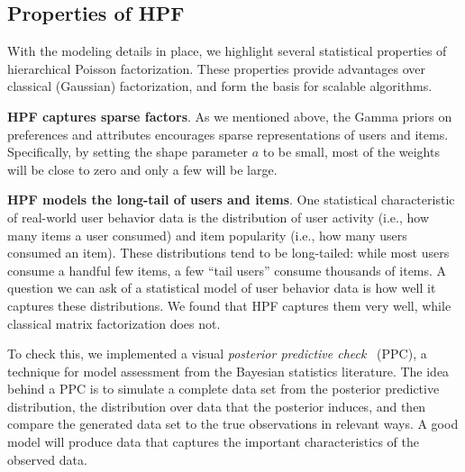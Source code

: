 
\subsection{Properties of HPF}

With the modeling details in place, we highlight several statistical
properties of hierarchical Poisson factorization.  These properties
provide advantages over classical (Gaussian) factorization, and
form the basis for scalable algorithms.

{\bf HPF captures sparse factors}.  As we mentioned above, the
  Gamma priors on preferences and attributes encourages sparse
  representations of users and items.  Specifically, by setting the
  shape parameter $a$ to be small, most of the weights will be close
  to zero and only a few will be large.


{\bf HPF models the long-tail of users and items}.  One statistical
characteristic of real-world user behavior data is the distribution of
user activity (i.e., how many items a user consumed) and item
popularity (i.e., how many users consumed an item).  These
distributions tend to be long-tailed: while most users consume a
handful few items, a few ``tail users'' consume thousands of items.  A
question we can ask of a statistical model of user behavior data is
how well it captures these distributions.  We found that HPF captures
them very well, while classical matrix factorization does not.

To check this, we implemented a visual \textit{posterior predictive
  check}~\cite{Rubin:1984,Gelman:1996} (PPC), a technique for model
assessment from the Bayesian statistics literature.  The idea behind a
PPC is to simulate a complete data set from the posterior predictive
distribution, the distribution over data that the posterior induces,
and then compare the generated data set to the true observations in
relevant ways.  A good model will produce data that captures the
important characteristics of the observed data.

